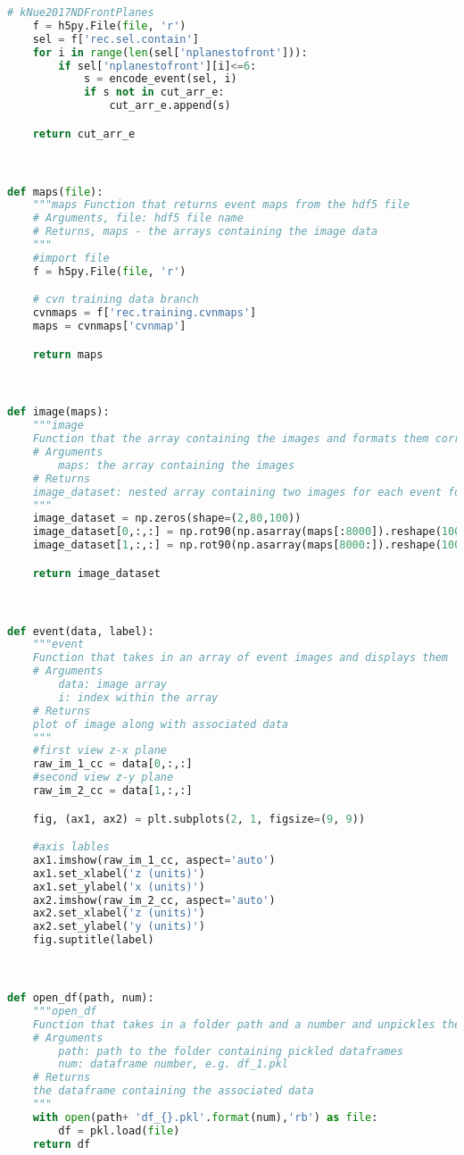 \begin{lstlisting}[language=Python]
    # kNue2017NDFrontPlanes
    f = h5py.File(file, 'r')
    sel = f['rec.sel.contain']
    for i in range(len(sel['nplanestofront'])):
        if sel['nplanestofront'][i]<=6:
            s = encode_event(sel, i)
            if s not in cut_arr_e:
                cut_arr_e.append(s)

    return cut_arr_e



def maps(file):
    """maps Function that returns event maps from the hdf5 file
    # Arguments, file: hdf5 file name
    # Returns, maps - the arrays containing the image data
    """
    #import file
    f = h5py.File(file, 'r')

    # cvn training data branch
    cvnmaps = f['rec.training.cvnmaps']
    maps = cvnmaps['cvnmap']

    return maps



def image(maps):
    """image
    Function that the array containing the images and formats them correctly
    # Arguments
        maps: the array containing the images
    # Returns
	image_dataset: nested array containing two images for each event for the z-y and z-x planes
    """
    image_dataset = np.zeros(shape=(2,80,100))
    image_dataset[0,:,:] = np.rot90(np.asarray(maps[:8000]).reshape(100,80))
    image_dataset[1,:,:] = np.rot90(np.asarray(maps[8000:]).reshape(100,80))

    return image_dataset



def event(data, label):
    """event
    Function that takes in an array of event images and displays them
    # Arguments
        data: image array
        i: index within the array
    # Returns
	plot of image along with associated data
    """
    #first view z-x plane
    raw_im_1_cc = data[0,:,:]
    #second view z-y plane
    raw_im_2_cc = data[1,:,:]

    fig, (ax1, ax2) = plt.subplots(2, 1, figsize=(9, 9))

    #axis lables
    ax1.imshow(raw_im_1_cc, aspect='auto')
    ax1.set_xlabel('z (units)')
    ax1.set_ylabel('x (units)')
    ax2.imshow(raw_im_2_cc, aspect='auto')
    ax2.set_xlabel('z (units)')
    ax2.set_ylabel('y (units)')
    fig.suptitle(label)



def open_df(path, num):
    """open_df
    Function that takes in a folder path and a number and unpickles the assosiated dataframe
    # Arguments
        path: path to the folder containing pickled dataframes
        num: dataframe number, e.g. df_1.pkl
    # Returns
	the dataframe containing the associated data
    """
    with open(path+ 'df_{}.pkl'.format(num),'rb') as file:
        df = pkl.load(file)
    return df




\end{lstlisting}
